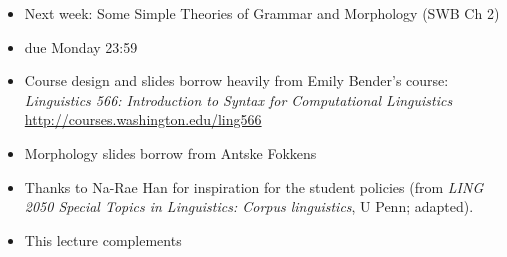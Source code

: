 \documentclass[a4paper,landscape,headrule,footrule]{foils}
\begin{document}
\medskip

\begin{itemize}
\item Next week: Some Simple Theories of Grammar and Morphology (SWB Ch 2)
\item {} due Monday 23:59
\end{itemize}
  

\begin{itemize}
\item Course design and slides borrow heavily from Emily Bender's course:
\textit{Linguistics 566: Introduction to Syntax for Computational Linguistics}
\\ \url{http://courses.washington.edu/ling566}
\item Morphology slides borrow from Antske Fokkens 
\item Thanks to Na-Rae Han for 
  inspiration for the student policies (from  \textit{LING 2050 Special Topics in Linguistics: Corpus linguistics}, U Penn; adapted).

\item This lecture complements \citet[Chapter 1]{sag:wasow:bender:2003}
\end{itemize}





\end{document}
